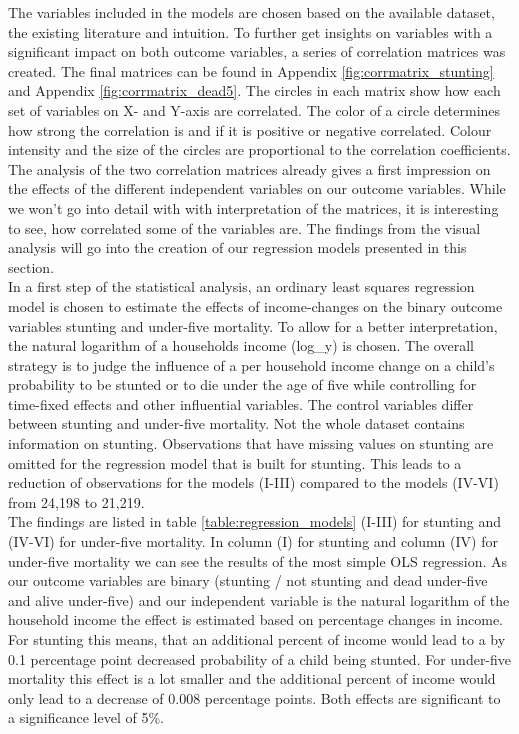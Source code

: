 \documentclass[a4paper, 11pt]{article} %
\begin{document}
The variables included in the models are chosen based on the available dataset, the existing literature and intuition. To further get insights on variables with a significant impact on both outcome variables, a series of correlation matrices was created. The final matrices can be found in Appendix \ref{fig:corrmatrix_stunting} and Appendix \ref{fig:corrmatrix_dead5}. The circles in each matrix show how each set of variables on X- and Y-axis are correlated. The color of a circle determines how strong the correlation is and if it is positive or negative correlated. Colour intensity and the size of the circles are proportional to the correlation coefficients. The analysis of the two correlation matrices already gives a first impression on the effects of the different independent variables on our outcome variables. While we won't go into detail with with interpretation of the matrices, it is interesting to see, how correlated some of the variables are. The findings from the visual analysis will go into the creation of our regression models presented in this section. \\

In a first step of the statistical analysis, an ordinary least squares regression model is chosen to estimate the effects of income-changes on the binary outcome variables stunting and under-five mortality. To allow for a better interpretation, the natural logarithm of a households income (log\_y) is chosen. The overall strategy is to judge the influence of a per household income change on a child's probability to be stunted or to die under the age of five while controlling for time-fixed effects and other influential variables. The control variables differ between stunting and under-five mortality. Not the whole dataset contains information on stunting. Observations that have missing values on stunting are omitted for the regression model that is built for stunting. This leads to a reduction of observations for the models (I-III) compared to the models (IV-VI) from 24,198 to 21,219. \\

The findings are listed in table \ref{table:regression_models} (I-III) for stunting and (IV-VI) for under-five mortality. In column (I) for stunting and column (IV) for under-five mortality we can see the results of the most simple OLS regression. As our outcome variables are binary (stunting / not stunting and dead under-five and alive under-five) and our independent variable is the natural logarithm of the household income the effect is estimated based on percentage changes in income. For stunting this means, that an additional percent of income would lead to a by 0.1 percentage point decreased probability of a child being stunted. For under-five mortality this effect is a lot smaller and the additional percent of income would only lead to a decrease of 0.008 percentage points. Both effects are significant to a significance level of 5\%. \\
\end{document}
